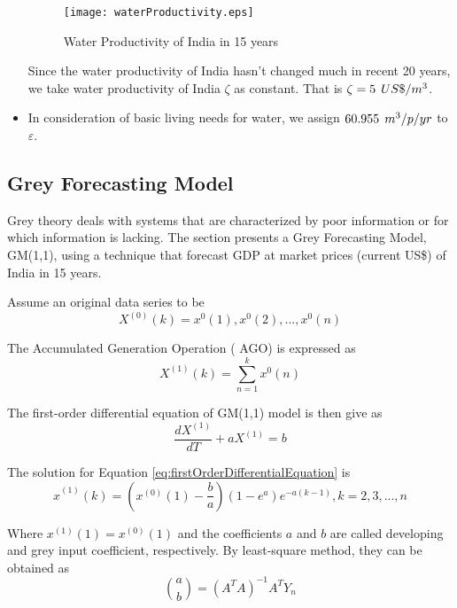 \documentclass[tcn = 45538, sheet = true, abstract = true]{mcmthesis}
\begin{document}
\begin{itemize}
\begin{figure}[]
\small
\centering
\texttt{[image: waterProductivity.eps]}
\caption{Water Productivity of India in 15 years} \label{fig:waterProductivity}
\end{figure}

Since the water productivity of India hasn't changed much in recent 20 years, 
we take water productivity of India $\zeta$ as constant. 
That is $\zeta = 5\hspace{1 ex} US\$ / m^3$.

\item In consideration of basic living needs for water, 
we assign $60.955\hspace{1 ex} m^3/p/yr$ to $\varepsilon$. 
\end{itemize}

\subsection{Grey Forecasting Model}

\hspace{1.5 em} Grey theory deals with systems that are characterized by poor information or for which information is lacking.
The section presents a Grey Forecasting Model, 
GM(1,1), 
using a technique that forecast GDP at market prices 
(current US\$) of India in 15 years.

Assume an original data series to be
\begin{equation}
X^{(0)}(k) = {x^0(1), x^0(2), ... , x^0(n)}
\end{equation}

The Accumulated Generation Operation 
( AGO) 
is expressed as
\begin{equation}
X^{(1)}(k) = \sum_{n = 1}^{k} x^0(n)
\end{equation}

The first-order differential equation of GM(1,1) model is then give as
\begin{equation}
\frac{dX^{(1)}}{dT} + aX^{(1)} = b
\label{eq:firstOrderDifferentialEquation}
\end{equation}

The solution for Equation \eqref{eq:firstOrderDifferentialEquation} is
\begin{equation}
\widehat{x}^{(1)}(k) = (x^{(0)}(1) - \frac{b}{a})(1 - e^a)e^{-a(k - 1)}, k = 2,3, ..., n
\end{equation}

Where $x^{(1)}(1) = x^{(0)}(1)$ and the coefficients $a$ and $b$ are called developing and grey input coefficient, 
respectively. 
By least-square method, 
they can be obtained as
\begin{equation}
\binom{a}{b} = (A^TA)^{-1}A^TY_{n}
\end{equation}
\end{document}

